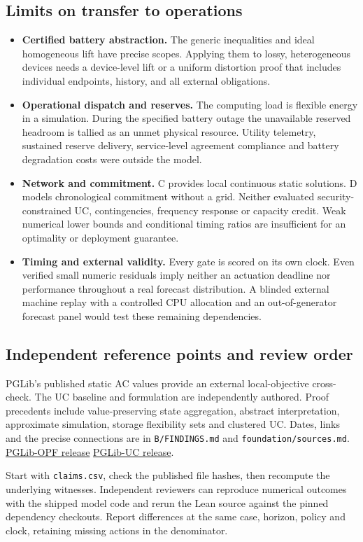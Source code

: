 \documentclass[10pt,letterpaper]{article}
\newcommand{\sub}[1]{\subsection*{\color{accent}#1}}
\begin{document}
\sub{Limits on transfer to operations}
\begin{itemize}
\item \textbf{Certified battery abstraction.} The generic inequalities and ideal homogeneous lift have precise scopes. Applying them to lossy, heterogeneous devices needs a device-level lift or a uniform distortion proof that includes individual endpoints, history, and all external obligations.
\item \textbf{Operational dispatch and reserves.} The computing load is flexible energy in a simulation. During the specified battery outage the unavailable reserved headroom is tallied as an unmet physical resource. Utility telemetry, sustained reserve delivery, service-level agreement compliance and battery degradation costs were outside the model.
\item \textbf{Network and commitment.} C provides local continuous static solutions. D models chronological commitment without a grid. Neither evaluated security-constrained UC, contingencies, frequency response or capacity credit. Weak numerical lower bounds and conditional timing ratios are insufficient for an optimality or deployment guarantee.
\item \textbf{Timing and external validity.} Every gate is scored on its own clock. Even verified small numeric residuals imply neither an actuation deadline nor performance throughout a real forecast distribution. A blinded external machine replay with a controlled CPU allocation and an out-of-generator forecast panel would test these remaining dependencies.
\end{itemize}
\sub{Independent reference points and review order}
PGLib's published static AC values provide an external local-objective cross-check. The UC baseline and formulation are independently authored. Proof precedents include value-preserving state aggregation, abstract interpretation, approximate simulation, storage flexibility sets and clustered UC. Dates, links and the precise connections are in \texttt{B/FINDINGS.md} and \texttt{foundation/sources.md}. \href{https://github.com/power-grid-lib/pglib-opf/tree/dc6be4b2f85ca0e776952ec22cbd4c22396ea5a3}{PGLib-OPF release}\quad
\href{https://github.com/power-grid-lib/pglib-uc/tree/39a7f38cf4703de92f0291f0c873c2e98c789301}{PGLib-UC release}.

Start with \texttt{claims.csv}, check the published file hashes, then recompute the underlying witnesses. Independent reviewers can reproduce numerical outcomes with the shipped model code and rerun the Lean source against the pinned dependency checkouts. Report differences at the same case, horizon, policy and clock, retaining missing actions in the denominator.
\end{document}
